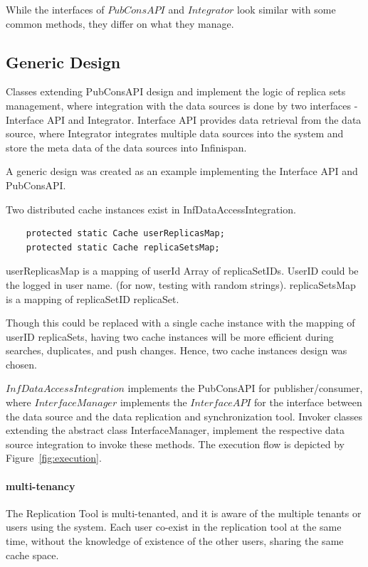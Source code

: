 \documentclass[conference]{IEEEtran}
\begin{document}
While the interfaces of $PubConsAPI$ and $Integrator$ look similar with some common methods, they differ on what they manage. 

\subsection{Generic Design}
Classes extending PubConsAPI design and implement the logic of replica sets management, where integration with the data sources is done by two interfaces - Interface API and Integrator. Interface API provides data retrieval from the data source, where Integrator integrates multiple data sources into the system and store the meta data of the data sources into Infinispan.

A generic design was created as an example implementing the Interface API and PubConsAPI.

Two distributed cache instances exist in InfDataAccessIntegration.
\begin{lstlisting}  
    protected static Cache userReplicasMap;
    protected static Cache replicaSetsMap;
\end{lstlisting}  
userReplicasMap is a mapping of userId  Array of replicaSetIDs. UserID could be the logged in user name. (for now, testing with random strings).
replicaSetsMap is a mapping of replicaSetID  replicaSet.

Though this could be replaced with a single cache instance with the mapping of userID  replicaSets, having two cache instances will be more efficient during searches, duplicates, and push changes. Hence, two cache instances design was chosen.

$InfDataAccessIntegration$ implements the PubConsAPI for publisher/consumer, where $InterfaceManager$ implements the $InterfaceAPI$ for the interface between the data source and the data replication and synchronization tool. Invoker classes extending the abstract class InterfaceManager, implement the respective data source integration to invoke these methods. The execution flow is depicted by Figure~\ref{fig:execution}.

\paragraph*{multi-tenancy}
The Replication Tool is multi-tenanted, and it is aware of the multiple tenants or users using the system. Each user co-exist in the replication tool at the same time, without the knowledge of existence of the other users, sharing the same cache space. 
\end{document}
